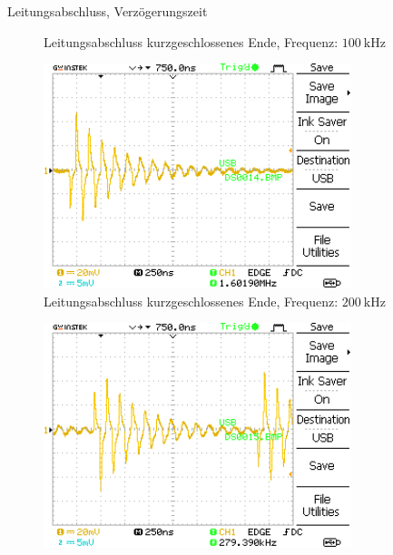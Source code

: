 \documentclass[ngerman]{scrartcl}
\theoremstyle{definition}
\begin{document}
\begin{aufgabe}{Leitungsabschluss, Verzögerungszeit}
\begin{unteraufgabe}
\begin{figure}[H]
					\caption{Leitungsabschluss kurzgeschlossenes Ende, Frequenz: $\SI{100}{\kilo\hertz}$}
					\label{fig:DS0013}
				\end{figure}
				\begin{figure}[H]
					\centering
					\includegraphics[width=0.8\textwidth]{MesswerteVersuch1/DS0014.png}	

					\caption{Leitungsabschluss kurzgeschlossenes Ende, Frequenz: $\SI{200}{\kilo\hertz}$}
					\label{fig:DS0014}
				\end{figure}
				\begin{figure}[H]
					\centering
					\includegraphics[width=0.8\textwidth]{MesswerteVersuch1/DS0015.png}	


\end{figure}
\end{unteraufgabe}
\end{aufgabe}
\end{document}
